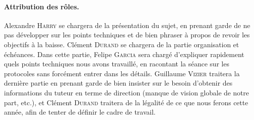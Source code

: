 \documentclass[a4paper, 11pt]{article}
\begin{document}
\paragraph{Attribution des rôles. } Alexandre \textsc{Harry} se chargera de la présentation du sujet, en prenant garde de ne pas développer sur les points techniques et de bien phraser à propos de revoir les objectifs à la baisse. Clément \textsc{Durand} se chargera de la partie organisation et échéances. Dans cette partie, Felipe \textsc{Garcia} sera chargé d'expliquer rapidement quels points techniques nous avons travaillé, en racontant la séance sur les protocoles sans forcément entrer dans les détails. Guillaume \textsc{Vizier} traitera la dernière partie en prenant garde de bien insister sur le besoin d'obtenir des informations du tuteur en terme de direction (manque de vision globale de notre part, etc.), et Clément \textsc{Durand} traitera de la légalité de ce que nous ferons cette année, afin de tenter de définir le cadre de travail.
\end{document}
